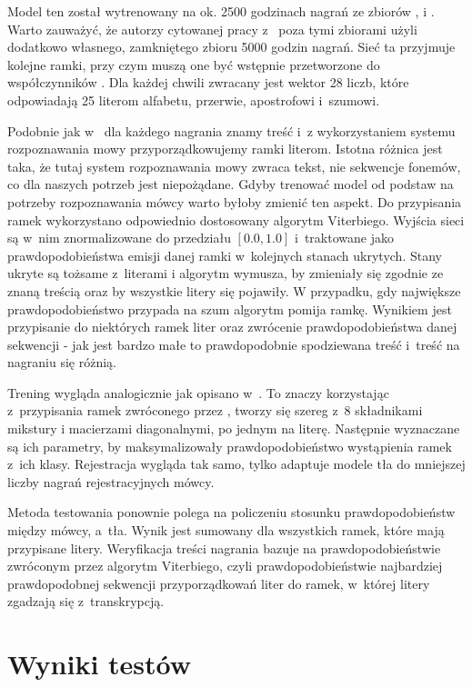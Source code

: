 Model ten został wytrenowany na ok. 2500 godzinach nagrań ze zbiorów , 
i . Warto zauważyć, że autorzy cytowanej pracy z~ poza tymi zbiorami użyli
dodatkowo własnego, zamkniętego zbioru 5000 godzin nagrań. Sieć ta przyjmuje kolejne ramki, przy czym muszą
one być wstępnie przetworzone do współczynników . Dla każdej chwili zwracany jest wektor 28 liczb,
które odpowiadają 25 literom alfabetu, przerwie, apostrofowi i~szumowi.

Podobnie jak w~ dla każdego nagrania znamy treść i~z wykorzystaniem systemu rozpoznawania
mowy przyporządkowujemy ramki literom. Istotna różnica jest taka, że tutaj system rozpoznawania mowy zwraca
tekst, nie sekwencje fonemów, co dla naszych potrzeb jest niepożądane. Gdyby trenować model od podstaw na
potrzeby rozpoznawania mówcy warto byłoby zmienić ten aspekt. Do przypisania ramek wykorzystano odpowiednio
dostosowany algorytm Viterbiego. Wyjścia sieci są w~nim znormalizowane do przedziału $[0.0, 1.0]$ i~traktowane
jako prawdopodobieństwa emisji danej ramki w~kolejnych stanach ukrytych. Stany ukryte są tożsame z~literami
i algorytm wymusza, by zmieniały się zgodnie ze znaną treścią oraz by wszystkie litery się pojawiły.
W przypadku, gdy największe prawdopodobieństwo przypada na szum algorytm pomija ramkę. Wynikiem
jest przypisanie do niektórych ramek liter oraz zwrócenie prawdopodobieństwa danej sekwencji - jak jest
bardzo małe to prawdopodobnie spodziewana treść i~treść na nagraniu się różnią.

Trening wygląda analogicznie jak opisano w~. To znaczy korzystając z~przypisania ramek
zwróconego przez , tworzy się szereg  z~$8$ składnikami mikstury
i macierzami diagonalnymi, po jednym na literę. Następnie wyznaczane są ich parametry, by
maksymalizowały prawdopodobieństwo wystąpienia
ramek z~ich klasy. Rejestracja wygląda tak samo, tylko  adaptuje modele tła do
mniejszej liczby nagrań rejestracyjnych mówcy.

Metoda testowania ponownie polega na policzeniu stosunku prawdopodobieństw między  mówcy, a~tła.
Wynik jest sumowany dla wszystkich ramek, które mają przypisane litery. Weryfikacja treści nagrania
bazuje na prawdopodobieństwie zwróconym przez algorytm Viterbiego, czyli prawdopodobieństwie najbardziej
prawdopodobnej sekwencji przyporządkowań liter do ramek, w~której litery zgadzają się z~transkrypcją.

\section{Wyniki testów}
\label{sec:test_results}

